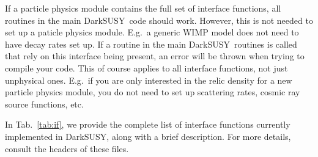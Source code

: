 \documentclass[a4paper,10pt,oneside]{book}
\newcommand{\ds}{{\sffamily DarkSUSY}}
\begin{document}
If a particle physics module contains the full set of interface functions, all
routines in the main \ds\ code should work. However, this is not needed to set up a paticle physics module. E.g.\ a generic WIMP model does not need to have decay rates set up. If a routine in the main \ds\ routines is called that rely on this interface being present, an error will be thrown when trying to compile your code. This of course applies to all interface functions, not just unphysical ones. E.g.\ if you are only interested in the relic density for a new particle physics module, you do not need to set up scattering rates, cosmic ray source functions, etc.

In Tab.~\ref{tab:if}, we provide the complete list of interface functions currently implemented in \ds,
along with a brief description. For more details, consult the headers of these files.

\bigskip
\end{document}
